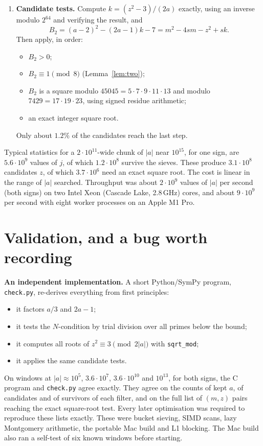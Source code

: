 \documentclass[11pt]{article}
\theoremstyle{remark}
\theoremstyle{definition}
\begin{document}
\begin{enumerate}
  roots, with $z\equiv0\pmod 3$.  Only one representative of each pair $\{R,\,m-R\}$ is built.  Both
  odd lifts $z$ and $2m-z$ in $[0,m+5]$ are then tested.
\item \textbf{Candidate tests.}  Compute $k=(z^2-3)/(2a)$ exactly, using an inverse modulo $2^{64}$
  and verifying the result, and
  \[
  B_2=(a-2)^2-(2a-1)k-7=m^2-4sm-z^2+sk .
  \]
  Then apply, in order:
  \begin{itemize}
  \item $B_2>0$;
  \item $B_2\equiv1\pmod8$ (Lemma~\ref{lem:two});
  \item $B_2$ is a square modulo $45045=5\cdot7\cdot9\cdot11\cdot13$ and modulo
    $7429=17\cdot19\cdot23$, using signed residue arithmetic;
  \item an exact integer square root.
  \end{itemize}
  Only about $1.2\%$ of the candidates reach the last step.
\end{enumerate}

Typical statistics for a $2\cdot10^{11}$-wide chunk of $|a|$ near $10^{15}$, for one sign, are
$5.6\cdot10^9$ values of $j$, of which $1.2\cdot10^8$ survive the sieves.  These produce
$3.1\cdot10^8$ candidates $z$, of which $3.7\cdot10^6$ need an exact square root.  The cost is
linear in the range of $|a|$ searched.  Throughput was about $2\cdot10^9$ values of $|a|$ per
second (both signs) on two Intel Xeon (Cascade Lake, 2.8\,GHz) cores, and about
$9\cdot10^9$ per second with eight worker processes on an Apple M1 Pro.

\section{Validation, and a bug worth recording}

\textbf{An independent implementation.}  A short Python/SymPy program, \texttt{check.py}, re-derives
everything from first principles:
\begin{itemize}
\item it factors $a/3$ and $2a-1$;
\item it tests the $N$-condition by trial division over all primes below the bound;
\item it computes all roots of $z^2\equiv3\pmod{2|a|}$ with \texttt{sqrt\_mod};
\item it applies the same candidate tests.
\end{itemize}
On windows at $|a|\approx10^5$, $3.6\cdot10^7$, $3.6\cdot10^{10}$ and $10^{13}$, for both signs, the
C program and \texttt{check.py} agree exactly.  They agree on the counts of kept $a$, of candidates
and of survivors of each filter, and on the full list of $(m,z)$ pairs reaching the exact
square-root test.  Every later optimisation was required to reproduce these lists exactly.  These
were bucket sieving, SIMD scans, lazy Montgomery arithmetic, the portable Mac build and L1 blocking.
The Mac build also ran a self-test of six known windows before starting.
\end{document}
